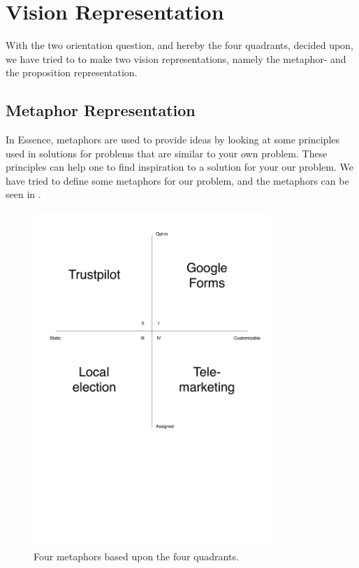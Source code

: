 
\section{Vision Representation}
\label{sec:vision_representation}

With the two orientation question, and hereby the four quadrants, decided upon, we have tried to to make two vision representations, namely the metaphor- and the proposition representation.

\subsection{Metaphor Representation}
\label{sub:metaphor_representation}

In Essence, metaphors are used to provide ideas by looking at some principles used in solutions for problems that are similar to your own problem. These principles can help one to find inspiration to a solution for your our problem. We have tried to define some metaphors for our problem, and the metaphors can be seen in .

\begin{figure}[!htbp]
	\centering
	\includegraphics[width=0.8\textwidth]{graphic/problem_analysis/vision/metaphor.pdf}
	\caption{Four metaphors based upon the four quadrants.}
	\label{fig:metaphor}
\end{figure}
\FloatBarrier

